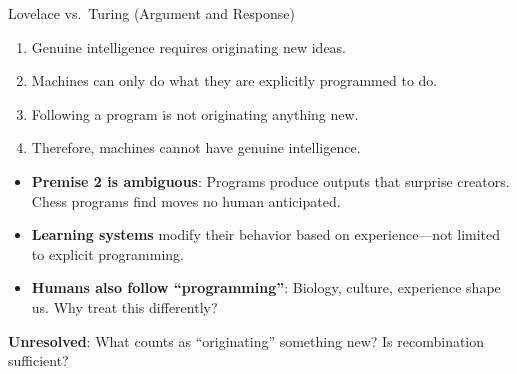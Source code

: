 ﻿\documentclass[aspectratio=169,11pt]{beamer}
\begin{document}
\begin{frame}{Lovelace vs.\ Turing (Argument and Response)}
\begin{objectionbox}
\scriptsize
\begin{enumerate}
    \item Genuine intelligence requires originating new ideas.
    \item Machines can only do what they are explicitly programmed to do.
    \item Following a program is not originating anything new.
    \item Therefore, machines cannot have genuine intelligence.
\end{enumerate}
\end{objectionbox}

\begin{probox}
\scriptsize
\begin{itemize}
    \item \textbf{Premise 2 is ambiguous}: Programs produce outputs that surprise creators. Chess programs find moves no human anticipated.
    \item \textbf{Learning systems} modify their behavior based on experience---not limited to explicit programming.
    \item \textbf{Humans also follow ``programming''}: Biology, culture, experience shape us. Why treat this differently?
\end{itemize}
\end{probox}

{\small \textbf{Unresolved}: What counts as ``originating'' something new? Is recombination sufficient?}
\end{frame}
\end{document}
